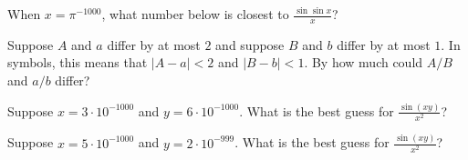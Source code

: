 \documentclass{ximera}
\newcommand{\recommendation}[1]{}
\begin{document}
\begin{shuffle}
\begin{problem}
  When $x = \pi^{-1000}$, what number below is closest to $\frac{\sin \sin x}{x}$?
  \begin{multipleChoice}
  \end{multipleChoice}
\end{problem}

\begin{problem}
  Suppose $A$ and $a$ differ by at most $2$ and suppose $B$ and $b$
  differ by at most $1$.  In symbols, this means that $|A - a| < 2$ and $|B - b| < 1$.
  By how much could $A/B$ and $a/b$ differ?
  \begin{multipleChoice}
  \end{multipleChoice}
\end{problem}

\begin{problem}
  Suppose $x = 3 \cdot 10^{-1000}$ and $y = 6 \cdot 10^{-1000}$.  What is the best guess for $\frac{\sin (xy)}{x^2}$?
  \begin{multipleChoice}
  \end{multipleChoice}
\end{problem}

\begin{problem}
  Suppose $x = 5 \cdot 10^{-1000}$ and $y = 2 \cdot 10^{-999}$.  What is the best guess for $\frac{\sin (xy)}{x^2}$?
  \begin{multipleChoice}
  \end{multipleChoice}
\end{problem}


\end{shuffle}
\end{document}
